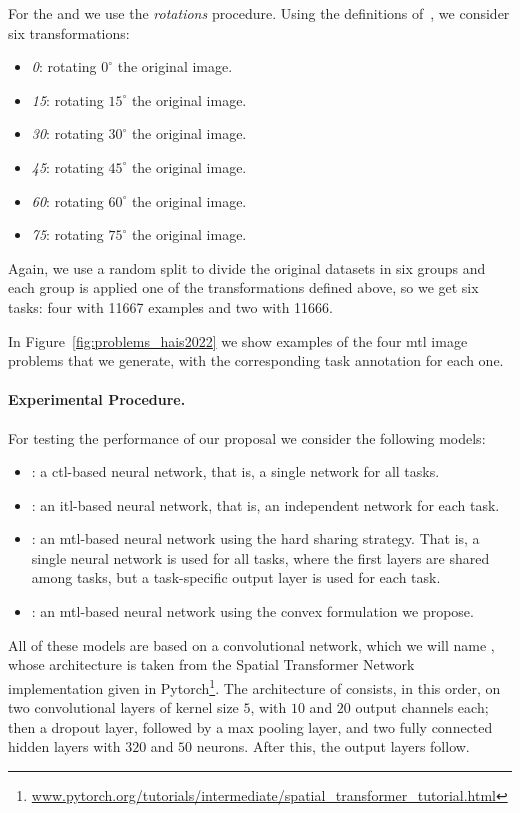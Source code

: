 %
For the  and  we use the \emph{rotations} procedure. Using the definitions of~\cite{GhifaryKZB15}, we consider six transformations:
\begin{itemize}
    \item \textit{0}: rotating $0^{\circ}$ the original image.
    \item \textit{15}: rotating $15^{\circ}$ the original image.
    \item \textit{30}: rotating $30^{\circ}$ the original image.
    \item \textit{45}: rotating $45^{\circ}$ the original image.
    \item \textit{60}: rotating $60^{\circ}$ the original image.
    \item \textit{75}: rotating $75^{\circ}$ the original image.
\end{itemize}
Again, we use a random split to divide the original datasets in six groups and each group is applied one of the transformations defined above, so we get six tasks: four with \num{11667} examples and two with \num{11666}.
%

In Figure~\ref{fig:problems_hais2022} we show examples of the four \acrshort{mtl} image problems that we generate, with the corresponding task annotation for each one.



\paragraph*{Experimental Procedure.\\}
For testing the performance of our proposal we consider the following models:
\begin{itemize}
    \item {}: a \acrshort{ctl}-based neural network, that is, a single network for all tasks.
    \item {}: an \acrshort{itl}-based neural network, that is, an independent network for each task.
    \item {}: an \acrshort{mtl}-based neural network using the hard sharing strategy. That is, a single neural network is used for all tasks, where the first layers are shared among tasks, but a task-specific output layer is used for each task.
    \item {}: an \acrshort{mtl}-based neural network using the convex formulation we propose.
\end{itemize}
All of these models are based on a convolutional network, which we will name , whose architecture is taken from the Spatial Transformer Network~\citep{Jaderberg_2015} implementation given in Pytorch\footnote{\href{www.pytorch.org/tutorials/intermediate/spatial\_transformer\_tutorial.html}{www.pytorch.org/tutorials/intermediate/spatial\_transformer\_tutorial.html}}.
The architecture of  consists, in this order, on two convolutional layers of kernel size $5$, with $10$ and $20$ output channels each; then a dropout layer, followed by a max pooling layer, and two fully connected hidden layers with $320$ and $50$ neurons. After this, the output layers follow.

